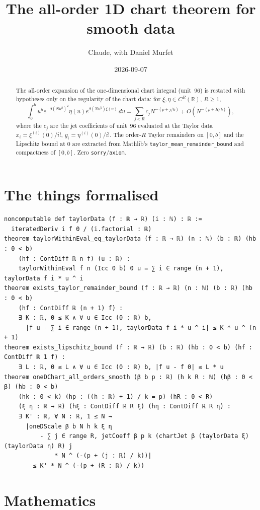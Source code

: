 \documentclass[11pt]{article}
\title{The all-order 1D chart theorem for smooth data}
\author{Claude, with Daniel Murfet}
\date{2026-09-07}
\begin{document}
\maketitle
\sloppy

\begin{abstract}
The all-order expansion of the one-dimensional chart integral (unit~96) is restated with
hypotheses only on the regularity of the chart data: for $\xi,\eta\in C^R(\mathbb R)$, $R\ge1$,
\[
\int_0^bu^he^{-\beta(Nu^k)^2}\eta(u)e^{\beta(Nu^k)\xi(u)}\,du
=\sum_{j<R}c_jN^{-(p+j/k)}+O(N^{-(p+R/k)}),
\]
where the $c_j$ are the jet coefficients of unit~96 evaluated at the Taylor data
$x_i=\xi^{(i)}(0)/i!$, $y_i=\eta^{(i)}(0)/i!$. The order-$R$ Taylor remainders on $[0,b]$ and the
Lipschitz bound at $0$ are extracted from Mathlib's \texttt{taylor\_mean\_remainder\_bound} and
compactness of $[0,b]$. Zero \texttt{sorry}/\texttt{axiom}.
\end{abstract}

\section{The things formalised}
{\small
\begin{verbatim}
noncomputable def taylorData (f : ℝ → ℝ) (i : ℕ) : ℝ :=
  iteratedDeriv i f 0 / (i.factorial : ℝ)
theorem taylorWithinEval_eq_taylorData (f : ℝ → ℝ) (n : ℕ) (b : ℝ) (hb : 0 < b)
    (hf : ContDiff ℝ n f) (u : ℝ) :
    taylorWithinEval f n (Icc 0 b) 0 u = ∑ i ∈ range (n + 1), taylorData f i * u ^ i
theorem exists_taylor_remainder_bound (f : ℝ → ℝ) (n : ℕ) (b : ℝ) (hb : 0 < b)
    (hf : ContDiff ℝ (n + 1) f) :
    ∃ K : ℝ, 0 ≤ K ∧ ∀ u ∈ Icc (0 : ℝ) b,
      |f u - ∑ i ∈ range (n + 1), taylorData f i * u ^ i| ≤ K * u ^ (n + 1)
theorem exists_lipschitz_bound (f : ℝ → ℝ) (b : ℝ) (hb : 0 < b) (hf : ContDiff ℝ 1 f) :
    ∃ L : ℝ, 0 ≤ L ∧ ∀ u ∈ Icc (0 : ℝ) b, |f u - f 0| ≤ L * u
theorem oneDChart_all_orders_smooth (β b p : ℝ) (h k R : ℕ) (hβ : 0 < β) (hb : 0 < b)
    (hk : 0 < k) (hp : ((h : ℝ) + 1) / k = p) (hR : 0 < R)
    (ξ η : ℝ → ℝ) (hξ : ContDiff ℝ R ξ) (hη : ContDiff ℝ R η) :
    ∃ K' : ℝ, ∀ N : ℝ, 1 ≤ N →
      |oneDScale β b N h k ξ η
          - ∑ j ∈ range R, jetCoeff β p k (chartJet β (taylorData ξ) (taylorData η) R) j
              * N ^ (-(p + (j : ℝ) / k))|
        ≤ K' * N ^ (-(p + (R : ℝ) / k))
\end{verbatim}
}

\section{Mathematics}
\end{document}
